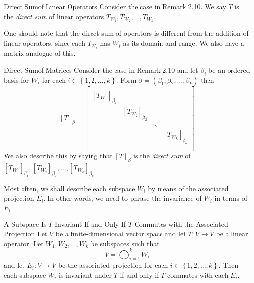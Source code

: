 \documentclass[linearalgebraII]{subfiles}
\begin{document}
    \begin{definition}{Direct Sum}{of Linear Operators}
        Consider the case in Remark 2.10. We say $T$ is the \emph{direct sum} of linear operators $T_{W_1}, T_{W_2}, \ldots, T_{W_k}$.
    \end{definition}
    
    \begin{remark}
        One should note that the direct sum of operators is different from the addition of linear operators, since each $T_{W_i}$ has $W_i$ as its domain and range. We also have a matrix analogue of this. 
    \end{remark}

    \begin{definition}{Direct Sum}{of Matrices}
        Consider the case in Remark 2.10 and let $\beta_i$ be an ordered basis for $W_i$ for each $i\in \left\lbrace 1, 2, \ldots, k \right\rbrace$. Form $\beta = \left( \beta_1, \beta_2, \ldots, \beta_k \right)$ then
        \begin{equation*}
            \left[ T \right] _\beta =
            \begin{bmatrix}
                & & & \\
                \left[ T_{W_1} \right]_{\beta_1} & & & \\
                & \left[ T_{W_2} \right]_{\beta_2} & & \\
                & & \ddots & \\
                & & & \left[ T_{W_k} \right]_{\beta_k} \\
                & & & \\
            \end{bmatrix}
        \end{equation*}
        We also describe this by saying that $[T]_\beta$ is the \emph{direct sum} of $[T_{W_1}]_{\beta_1}, [T_{W_2}]_{\beta_2}, \ldots, [T_{W_k}]_{\beta_k}$.
    \end{definition}

    \begin{remark}
        Most often, we shall describe each subspace $W_i$ by means of the associated projection $E_i$. In other words, we need to phrase the invariance of $W_i$ in terms of $E_i$.
    \end{remark}

    \begin{prop}{A Subspace Is $T$-Invariant If and Only If $T$ Commutes with the Associated Projection}
        Let $V$ be a finite-dimensional vector space and let $T:V\to V$ be a linear operator. Let $W_1, W_2, \ldots, W_k$ be subspaces such that
        \begin{equation*}
            V = \bigoplus^{k}_{i=1} W_i
        \end{equation*}
        and let $E_i:V\to V$ be the associated projection for each $i\in \left\lbrace 1, 2, \ldots, k \right\rbrace$. Then each subspace $W_i$ is invariant under $T$ if and only if $T$ commutes with each $E_i$.
    \end{prop}
\end{document}

